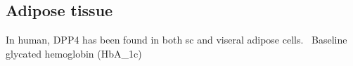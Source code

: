 \subsection{Adipose tissue}
In human, DPP4 has been found in both sc and viseral adipose cells.~\cite{Lamers2011} Baseline glycated hemoglobin (HbA_{1c}) 